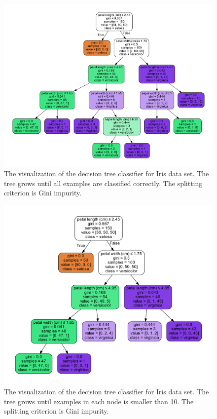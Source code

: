 \begin{refsection}
\begin{figure}[H]
	\centering
	\includegraphics[width=0.8\linewidth]{../figures/statisticalLearning/treeMethods/IrisDecisionTree_Gini}
	\caption{The visualization of the decision tree classifier for Iris data set. The tree grows until all examples are classified correctly. The splitting criterion is Gini impurity. }
	\label{fig:irisdecisiontreegini}
\end{figure}

\begin{figure}[H]
	\centering
	\includegraphics[width=0.7\linewidth]{../figures/statisticalLearning/treeMethods/IrisDecisionTree_minSamplesGini}
	\caption{The visualization of the decision tree classifier for Iris data set. The tree grows until examples in each node is smaller than 10. The splitting criterion is Gini impurity.}
	\label{fig:irisdecisiontreeminsamplesgini}
\end{figure}


\end{refsection}
